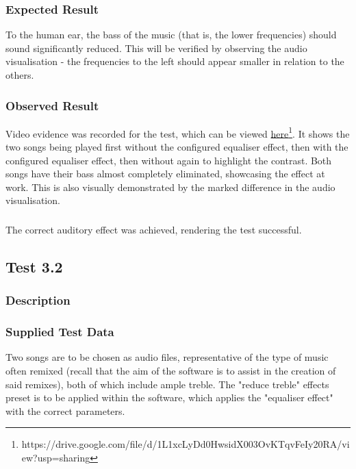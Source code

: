 \subsubsection{Expected Result}
To the human ear, the bass of the music (that is, the lower frequencies) should sound significantly reduced. This will be verified by observing the audio visualisation - the frequencies to the left should appear smaller in relation to the others.

\subsubsection{Observed Result}
\label{sec:evidence3.1}
Video evidence was recorded for the test, which can be viewed \href{https://drive.google.com/file/d/1L1xcLyDd0HwsidX003OvKTqvFeIy20RA/view?usp=sharing}{here}\footnote{
	https://drive.google.com/file/d/1L1xcLyDd0HwsidX003OvKTqvFeIy20RA/view?usp=sharing
}. It shows the two songs being played first without the configured equaliser effect, then with the configured equaliser effect, then without again to highlight the contrast. Both songs have their bass almost completely eliminated, showcasing the effect at work. This is also visually demonstrated by the marked difference in the audio visualisation.

\subsubsection{}
The correct auditory effect was achieved, rendering the test successful. 


\pagebreak
\subsection{Test 3.2}
\subsubsection{Description}
\paragraph{}
{
	\centering
}

\subsubsection{Supplied Test Data}
Two songs are to be chosen as audio files, representative of the type of music often remixed (recall that the aim of the software is to assist in the creation of said remixes), both of which include ample treble. The "reduce treble" effects preset is to be applied within the software, which applies the "equaliser effect" with the correct parameters.

